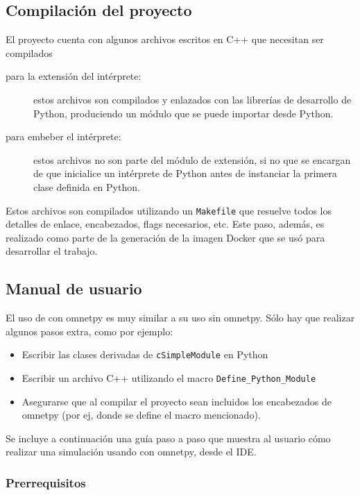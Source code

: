 \documentclass[]{article}
\begin{document}
\subsection{Compilación del proyecto}

El proyecto cuenta con algunos archivos escritos en C++ que necesitan ser
compilados

\begin{description}
    \item[para la extensión del intérprete:] estos archivos son compilados y
enlazados con las librerías de desarrollo de Python, produciendo un módulo que
se puede importar desde Python.

    \item[para embeber el intérprete:] estos archivos no son parte del módulo
de extensión, si no que se encargan de que \omnetpp{} inicialice un intérprete
de Python antes de instanciar la primera clase definida en Python.
\end{description}

Estos archivos son compilados utilizando un \verb!Makefile! que resuelve todos
los detalles de enlace, encabezados, flags necesarios, etc. Este paso, además,
es realizado como parte de la generación de la imagen Docker que se usó para
desarrollar el trabajo.

\subsection{Manual de usuario}

El uso de \omnetpp{} con omnetpy es muy similar a su uso sin omnetpy. Sólo hay que
realizar algunos pasos extra, como por ejemplo:

\begin{itemize}
    \item Escribir las clases derivadas de \verb!cSimpleModule! en Python

    \item Escribir un archivo C++ utilizando el macro
\verb!Define_Python_Module!

    \item Asegurarse que al compilar el proyecto sean incluidos los encabezados
de omnetpy (por ej, donde se define el macro mencionado).
\end{itemize}

Se incluye a continuación una guía paso a paso que muestra al usuario cómo
realizar una simulación usando \omnetpp{} con omnetpy, desde el IDE.

\subsubsection{Prerrequisitos}
\end{document}
